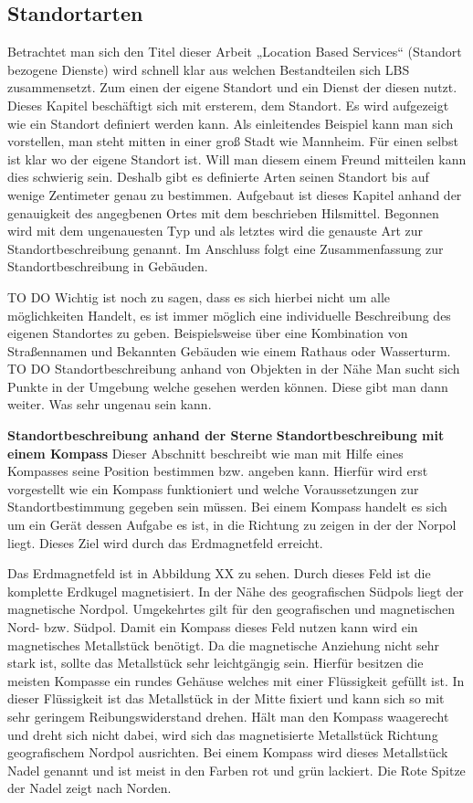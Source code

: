 \subsection{Standortarten}




Betrachtet man sich den Titel dieser Arbeit „Location Based Services“ (Standort bezogene Dienste) wird schnell klar aus welchen Bestandteilen sich LBS zusammensetzt. Zum einen der eigene Standort und ein Dienst der diesen nutzt. Dieses Kapitel beschäftigt sich mit ersterem, dem Standort. Es wird aufgezeigt wie ein Standort definiert werden kann.
Als einleitendes Beispiel kann man sich vorstellen, man steht mitten in einer groß Stadt wie Mannheim. Für einen selbst ist klar wo der eigene Standort ist. Will man diesem einem Freund mitteilen kann dies schwierig sein. Deshalb gibt es definierte Arten seinen Standort bis auf wenige Zentimeter genau zu bestimmen. Aufgebaut ist dieses Kapitel anhand der genauigkeit des angegbenen Ortes mit dem beschrieben Hilsmittel. Begonnen wird mit dem ungenauesten Typ und als letztes wird die genauste Art zur Standortbeschreibung genannt. Im Anschluss folgt eine Zusammenfassung zur Standortbeschreibung in Gebäuden.

TO DO
Wichtig ist noch zu sagen, dass es sich hierbei nicht um alle möglichkeiten Handelt, es ist immer möglich eine individuelle Beschreibung des eigenen Standortes zu geben. Beispielsweise über eine Kombination von Straßennamen und Bekannten Gebäuden wie einem Rathaus oder Wasserturm. 
TO DO
Standortbeschreibung anhand von Objekten in der Nähe
Man sucht sich Punkte in der Umgebung welche gesehen werden können. Diese gibt man dann weiter. Was sehr ungenau sein kann.

\textbf{Standortbeschreibung anhand der Sterne}
\textbf{Standortbeschreibung mit einem Kompass}
Dieser Abschnitt beschreibt wie man mit Hilfe eines Kompasses seine Position bestimmen bzw. angeben kann. Hierfür wird erst vorgestellt wie ein Kompass funktioniert und welche Voraussetzungen zur Standortbestimmung gegeben sein müssen.
Bei einem Kompass handelt es sich um ein Gerät dessen Aufgabe es ist, in die Richtung zu zeigen in der der Norpol liegt. Dieses Ziel wird durch das Erdmagnetfeld erreicht.
 
Das Erdmagnetfeld ist in Abbildung XX zu sehen. Durch dieses Feld ist die komplette Erdkugel magnetisiert. In der Nähe des geografischen Südpols liegt der magnetische Nordpol. Umgekehrtes gilt für den geografischen und magnetischen Nord- bzw. Südpol.
Damit ein Kompass dieses Feld nutzen kann wird ein magnetisches Metallstück benötigt. Da die magnetische Anziehung nicht sehr stark ist, sollte das Metallstück sehr leichtgängig sein. Hierfür besitzen die meisten Kompasse ein rundes Gehäuse welches mit einer Flüssigkeit gefüllt ist. In dieser Flüssigkeit ist das Metallstück in der Mitte fixiert und kann sich so mit sehr geringem Reibungswiderstand drehen. Hält man den Kompass waagerecht und dreht sich nicht dabei, wird sich das magnetisierte Metallstück Richtung geografischem Nordpol ausrichten. Bei einem Kompass wird dieses Metallstück Nadel genannt und ist meist in den Farben rot und grün lackiert. Die Rote Spitze der Nadel zeigt nach Norden.
 
